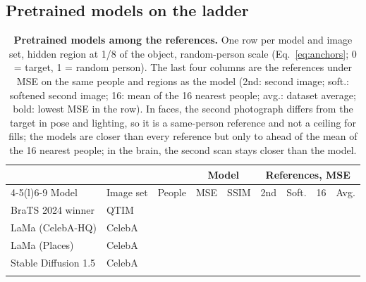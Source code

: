 \subsection{Pretrained models on the ladder}
\label{sec:r-models}
\begin{table}[t]
\centering
\caption{\textbf{Pretrained models among the references.}
One row per model and image set, hidden region at 1/8 of the object, random-person scale (Eq.~\ref{eq:anchors}; 0 = target, 1 = random person).
The last four columns are the references under \acs{MSE} on the same people and regions as the model (2nd: second image; soft.: softened second image; 16: mean of the 16 nearest people; avg.: dataset average; bold: lowest \acs{MSE} in the row).
In faces, the second photograph differs from the target in pose and lighting, so it is a same-person reference and not a ceiling for fills; the models are closer than every reference but only \mfFaceAheadMin{} to \mfFaceAheadMax{} ahead of the mean of the 16 nearest people; in the brain, the second scan stays closer than the model.}
\label{tab:models}
\scriptsize
\setlength{\tabcolsep}{2.2pt}
\begin{tabular}{@{}llrrrrrrr@{}}
\toprule
 & & & \multicolumn{2}{c}{Model} & \multicolumn{4}{c}{References, \acs{MSE}} \\
\cmidrule(lr){4-5}\cmidrule(l){6-9}
Model & Image set & People & \acs{MSE} & \acs{SSIM} & 2nd & Soft. & 16 & Avg. \\
\midrule
BraTS 2024 winner & QTIM & \mfBratsQtimN{} & \mfBratsQtimMse{} & \mfBratsQtimSsim{} & \textbf{\mfBratsQtimRefRepeatMse{}} & \textbf{\mfBratsQtimRefSoftMse{}} & \mfBratsQtimRefNearestMse{} & \mfBratsQtimRefMeanMse{} \\
\addlinespace[2pt]
LaMa (CelebA-HQ) & CelebA & \mfLamaHqCelebaN{} & \textbf{\mfLamaHqCelebaMse{}} & \mfLamaHqCelebaSsim{} & \mfLamaHqCelebaRefRepeatMse{} & \mfLamaHqCelebaRefSoftMse{} & \mfLamaHqCelebaRefNearestMse{} & \mfLamaHqCelebaRefMeanMse{} \\
LaMa (Places) & CelebA & \mfLamaPlacesCelebaN{} & \textbf{\mfLamaPlacesCelebaMse{}} & \mfLamaPlacesCelebaSsim{} & \mfLamaPlacesCelebaRefRepeatMse{} & \mfLamaPlacesCelebaRefSoftMse{} & \mfLamaPlacesCelebaRefNearestMse{} & \mfLamaPlacesCelebaRefMeanMse{} \\
Stable Diffusion 1.5 & CelebA & \mfSdCelebaN{} & \textbf{\mfSdCelebaMse{}} & \mfSdCelebaSsim{} & \mfSdCelebaRefRepeatMse{} & \mfSdCelebaRefSoftMse{} & \mfSdCelebaRefNearestMse{} & \mfSdCelebaRefMeanMse{} \\
\addlinespace[2pt]

\end{tabular}
\end{table}
